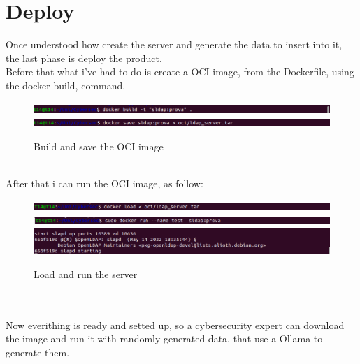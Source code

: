 \chapter{Deploy}
Once understood how create the server and generate the data to insert into it, the last phase is deploy the product.
\\ 
Before that what i've had to do is create a OCI image, from the Dockerfile, using the docker build, command.
\begin{figure}[h]
    \caption{Build and save the OCI image}
    \centering
    \includegraphics[width=15cm]{img/build.png}
    \includegraphics[width=15cm]{img/save.png}
\end{figure}
\\
After that i can run the OCI image, as follow:
\begin{figure}[h]
    \caption{Load and run the server}
    \centering
    \includegraphics[width=15cm]{img/load.png}
    \includegraphics[width=15cm]{img/runb.png}
    \includegraphics[width=15cm]{img/run.png}
\end{figure}
\\\\
Now everithing is ready and setted up, so a cybersecurity expert can download the image and run it with randomly generated data, that use a Ollama to generate them.
